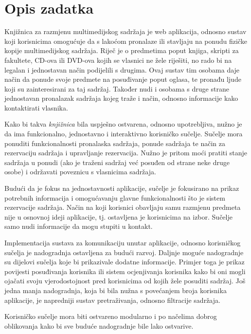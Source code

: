 \documentclass[times, utf8, zavrsni, numeric]{fer}
\newcommand{\razmakp}{\vspace{18pt}}
\begin{document}
\section{Opis zadatka}

Knjižnica za razmjenu multimedijskog sadržaja je web aplikacija, odnosno sustav koji korisnicima omogućuje da s lakoćom pronalaze ili stavljaju na ponudu fizičke kopije multimedijskog sadržaja.
Riječ je o predmetima poput knjiga, skripti za fakultete, CD-ova ili DVD-ova kojih se vlasnici ne žele riješiti, no rado bi na legalan i jednostavan način podijelili s drugima.
Ovaj sustav tim osobama daje način da ponude svoje predmete na posuđivanje poput oglasa, te pronađu ljude koji su zainteresirani za taj sadržaj.
Također nudi i osobama s druge strane jednostavan pronalazak sadržaja kojeg traže i način, odnosno informacije kako kontaktirati vlasnika.

\razmakp

Kako bi takva \emph{knjižnica} bila uspješno ostvarena, odnosno upotrebljiva, nužno je da ima funkcionalno, jednostavno i interaktivno korisničko sučelje.
Sučelje mora ponuditi funkcionalnosti pronalaska sadržaja, ponude sadržaja te način za rezervaciju sadržaja i upravljanje rezervacija.
Nužno je pritom moći pratiti stanje sadržaja u ponudi (ako je traženi sadržaj već posuđen od strane neke druge osobe) i održavati poveznicu s vlasnicima sadržaja.

Budući da je fokus na jednostavnosti aplikacije, sučelje je fokusirano na prikaz potrebnih informacija i omogućavanju glavne funkcionalnosti što je sistem rezervacije sadržaja.
Način na koji korisnici obavljaju samu razmjenu predmeta nije u osnovnoj ideji aplikacije, tj. ostavljena je korisnicima na izbor.
Sučelje samo nudi informacije da mogu stupiti u kontakt.

\razmakp

Implementacija sustava za komunikaciju unutar aplikacije, odnosno korisničkog sučelja je nadogradnja ostavljena za budući razvoj.
Daljnje moguće nadogradnje su dijelovi sučelja koje bi prikazivale dodatne informacije.
Primjer toga je prikaz povijesti posuđivanja korisnika ili sistem ocjenjivanja korisnika kako bi oni mogli ojačati svoju vjerodostojnost pred korisnicima od kojih žele posuditi sadržaj.
Još jedna manja nadogradnja, koja bi bila nužna s povećanjem broja korisnika aplikacije, je napredniji sustav pretraživanja, odnosno filtracije sadržaja.

Korisničko sučelje mora biti ostvareno modularno i po načelima dobrog oblikovanja kako bi sve buduće nadogradnje bile lako ostvarive.
\end{document}
